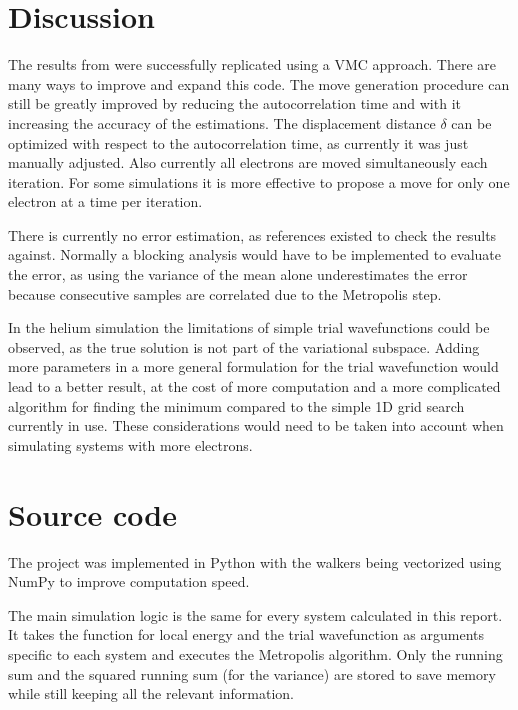 \documentclass[a4paper, 11pt]{article}          %
\begin{document}
    \section{Discussion}

    The results from \cite{Thijssen2007} were successfully replicated using a VMC approach. There are many ways to improve and expand this code. The move generation procedure can still be greatly improved by reducing the autocorrelation time and with it increasing the accuracy of the estimations. The displacement distance $\delta$ can be optimized with respect to the autocorrelation time, as currently it was just manually adjusted. Also currently all electrons are moved simultaneously each iteration. For some simulations it is more effective to propose a move for only one electron at a time per iteration.

    There is currently no error estimation, as references existed to check the results against. Normally a blocking analysis would have to be implemented to evaluate the error, as using the variance of the mean alone underestimates the error because consecutive samples are correlated due to the Metropolis step.

    In the helium simulation the limitations of simple trial wavefunctions could be observed, as the true solution is not part of the variational subspace. Adding more parameters in a more general formulation for the trial wavefunction would lead to a better result, at the cost of more computation and a more complicated algorithm for finding the minimum compared to the simple 1D grid search currently in use. These considerations would need to be taken into account when simulating systems with more electrons.

    \appendix

    \section{Source code}

    The project was implemented in Python with the walkers being vectorized using NumPy to improve computation speed.

    The main simulation logic is the same for every system calculated in this report. It takes the function for local energy and the trial wavefunction as arguments specific to each system and executes the Metropolis algorithm. Only the running sum and the squared running sum (for the variance) are stored to save memory while still keeping all the relevant information.
\end{document}
